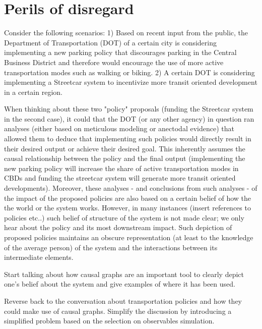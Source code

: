 \section{Perils of disregard}
Consider the following scenarios: 1) Based on recent input from the public, the Department of Transportation (DOT) of a certain city is considering implementing a new parking policy that discourages parking in the Central Business District and therefore would encourage the use of more active transportation modes such as walking or biking.
2) A certain DOT is considering implementing a Streetcar system to incentivize more transit oriented development in a certain region. 

When thinking about these two "policy" proposals (funding the Streetcar system in the second case), it could that the DOT (or any other agency) in question ran analyses (either based on meticulous modeling or anectodal evidence) that allowed them to deduce that implementing such policies would directly result in their desired output or achieve their desired goal.
This inherently assumes the causal relationship between the policy and the final output (implementing the new parking policy will increase the share of active transportation modes in CBDs and funding the streetcar system will generate more transit oriented developments).
Moreover, these analyses - and conclusions from such analyses - of the impact of the proposed policies are also based on a certain belief of how the the world or the system works. 
However, in many instances (insert references to policies etc..) such belief of structure of the system is not made clear; we only hear about the policy and its most downstream impact. 
Such depiction of proposed policies maintains an obscure representation (at least to the knowledge of the average person) of the system and the interactions between its intermediate elements.

Start talking about how causal graphs are an important tool to clearly depict one's belief about the system and give examples of where it has been used.

Reverse back to the conversation about transportation policies and how they could make use of causal graphs.
Simplify the discussion by introducing a simplified problem based on the selection on observables simulation.

\blindtext[2]